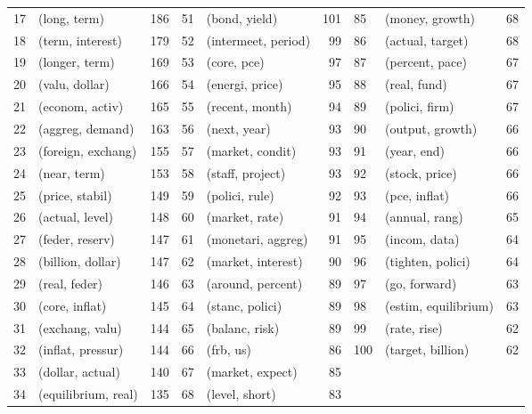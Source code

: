 \begin{tabular}{rlrrlrlll}
 17 &         (long, term) &   186 &  51 &          (bond, yield) &   101 &   85 &       (money, growth) &    68 \\
 18 &     (term, interest) &   179 &  52 &    (intermeet, period) &    99 &   86 &      (actual, target) &    68 \\
 19 &       (longer, term) &   169 &  53 &            (core, pce) &    97 &   87 &       (percent, pace) &    67 \\
 20 &       (valu, dollar) &   166 &  54 &        (energi, price) &    95 &   88 &          (real, fund) &    67 \\
 21 &      (econom, activ) &   165 &  55 &        (recent, month) &    94 &   89 &        (polici, firm) &    67 \\
 22 &     (aggreg, demand) &   163 &  56 &           (next, year) &    93 &   90 &      (output, growth) &    66 \\
 23 &   (foreign, exchang) &   155 &  57 &       (market, condit) &    93 &   91 &           (year, end) &    66 \\
 24 &         (near, term) &   153 &  58 &       (staff, project) &    93 &   92 &        (stock, price) &    66 \\
 25 &      (price, stabil) &   149 &  59 &         (polici, rule) &    92 &   93 &         (pce, inflat) &    66 \\
 26 &      (actual, level) &   148 &  60 &         (market, rate) &    91 &   94 &        (annual, rang) &    65 \\
 27 &      (feder, reserv) &   147 &  61 &     (monetari, aggreg) &    91 &   95 &         (incom, data) &    64 \\
 28 &    (billion, dollar) &   147 &  62 &     (market, interest) &    90 &   96 &     (tighten, polici) &    64 \\
 29 &        (real, feder) &   146 &  63 &      (around, percent) &    89 &   97 &         (go, forward) &    63 \\
 30 &       (core, inflat) &   145 &  64 &        (stanc, polici) &    89 &   98 &  (estim, equilibrium) &    63 \\
 31 &      (exchang, valu) &   144 &  65 &         (balanc, risk) &    89 &   99 &          (rate, rise) &    62 \\
 32 &    (inflat, pressur) &   144 &  66 &              (frb, us) &    86 &  100 &     (target, billion) &    62 \\
 33 &     (dollar, actual) &   140 &  67 &       (market, expect) &    85 &      &                       &       \\
 34 &  (equilibrium, real) &   135 &  68 &         (level, short) &    83 &      &                       &       \\
\bottomrule
\end{tabular}
